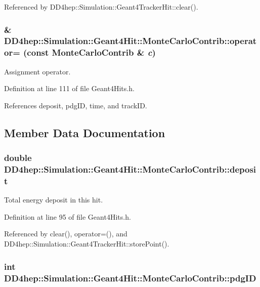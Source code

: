 Referenced by DD4hep::Simulation::Geant4TrackerHit::clear().\hypertarget{struct_d_d4hep_1_1_simulation_1_1_geant4_hit_1_1_monte_carlo_contrib_a7cd8b1e9b2e5767d1bcfce6fa38a398c}{
\subsubsection[{operator=}]{\& DD4hep::Simulation::Geant4Hit::MonteCarloContrib::operator= (const {\bf MonteCarloContrib} \& {\em c})}}
\label{struct_d_d4hep_1_1_simulation_1_1_geant4_hit_1_1_monte_carlo_contrib_a7cd8b1e9b2e5767d1bcfce6fa38a398c}


Assignment operator. 

Definition at line 111 of file Geant4Hits.h.

References deposit, pdgID, time, and trackID.

\subsection{Member Data Documentation}
\hypertarget{struct_d_d4hep_1_1_simulation_1_1_geant4_hit_1_1_monte_carlo_contrib_a3bbe67139ddec239f5dc33ace2986bb1}{
\subsubsection[{deposit}]{\setlength{\rightskip}{0pt plus 5cm}double {\bf DD4hep::Simulation::Geant4Hit::MonteCarloContrib::deposit}}}
\label{struct_d_d4hep_1_1_simulation_1_1_geant4_hit_1_1_monte_carlo_contrib_a3bbe67139ddec239f5dc33ace2986bb1}


Total energy deposit in this hit. 

Definition at line 95 of file Geant4Hits.h.

Referenced by clear(), operator=(), and DD4hep::Simulation::Geant4TrackerHit::storePoint().\hypertarget{struct_d_d4hep_1_1_simulation_1_1_geant4_hit_1_1_monte_carlo_contrib_aa0b40f39fd3df147934c6a2d609e72c1}{
\subsubsection[{pdgID}]{\setlength{\rightskip}{0pt plus 5cm}int {\bf DD4hep::Simulation::Geant4Hit::MonteCarloContrib::pdgID}}}
\label{struct_d_d4hep_1_1_simulation_1_1_geant4_hit_1_1_monte_carlo_contrib_aa0b40f39fd3df147934c6a2d609e72c1}


